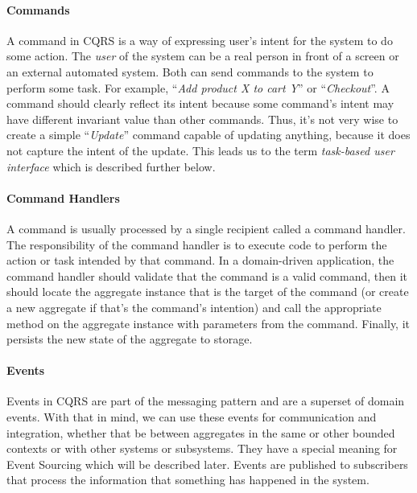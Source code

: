 \documentclass{book}
\begin{document}
\paragraph{Commands}\label{commands}

A command in CQRS is a way of expressing user's intent for the system to
do some action. The \emph{user} of the system can be a real person in
front of a screen or an external automated system. Both can send
commands to the system to perform some task. For example, ``\emph{Add
product X to cart Y}'' or ``\emph{Checkout}''. A command should clearly
reflect its intent because some command's intent may have different
invariant value than other commands. Thus, it's not very wise to create
a simple ``\emph{Update}'' command capable of updating anything, because
it does not capture the intent of the update. This leads us to the term
\emph{task-based user interface} which is described further below.~\cite{journey}

\paragraph{Command Handlers}\label{command-handlers}

A command is usually processed by a single recipient called a command
handler. The responsibility of the command handler is to execute code to
perform the action or task intended by that command. In a domain-driven
application, the command handler should validate that the command is a
valid command, then it should locate the aggregate instance that is the
target of the command (or create a new aggregate if that's the command's
intention) and call the appropriate method on the aggregate instance
with parameters from the command. Finally, it persists the new state of
the aggregate to storage.~\cite{journey}

\paragraph{Events}\label{events}

Events in CQRS are part of the messaging pattern and are a superset of
domain events. With that in mind, we can use these events for
communication and integration, whether that be between aggregates in the
same or other bounded contexts or with other systems or subsystems. They
have a special meaning for Event Sourcing which will be described later.
Events are published to subscribers that process the information that
something has happened in the system.~\cite{journey}
\end{document}
